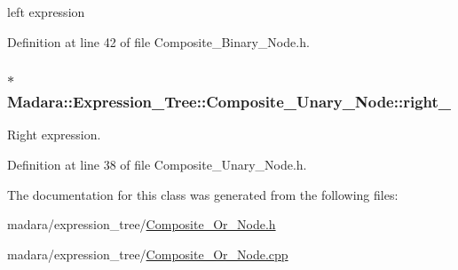 left expression 



Definition at line 42 of file Composite\_\-Binary\_\-Node.h.

\hypertarget{classMadara_1_1Expression__Tree_1_1Composite__Unary__Node_a077b7bd1b52df6f5c6adfde735556a68}{
\subsubsection[{right\_\-}]{$\ast$ {\bf Madara::Expression\_\-Tree::Composite\_\-Unary\_\-Node::right\_\-}}}
\label{d3/dc7/classMadara_1_1Expression__Tree_1_1Composite__Unary__Node_a077b7bd1b52df6f5c6adfde735556a68}


Right expression. 



Definition at line 38 of file Composite\_\-Unary\_\-Node.h.



The documentation for this class was generated from the following files:\begin{DoxyCompactItemize}
\item 
madara/expression\_\-tree/\hyperlink{Composite__Or__Node_8h}{Composite\_\-Or\_\-Node.h}\item 
madara/expression\_\-tree/\hyperlink{Composite__Or__Node_8cpp}{Composite\_\-Or\_\-Node.cpp}\end{DoxyCompactItemize}
